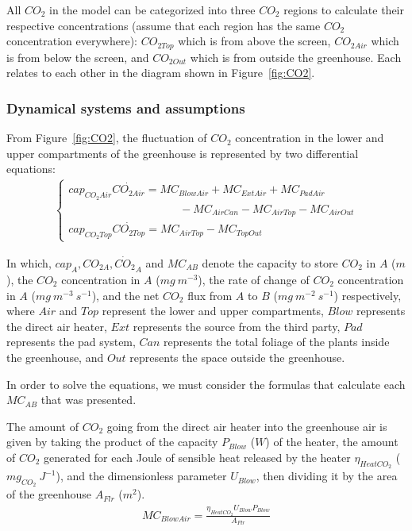 \documentclass[a4paper]{article}
\numberwithin{equation}{section}
\begin{document}
All \( CO_2 \) in the model can be categorized into three \( CO_2 \) regions to calculate their respective concentrations (assume that each region has the same \( CO_2 \) concentration everywhere): \( CO_{2Top} \) which is from above the screen, \( CO_{2Air} \) which is from below the screen, and \( CO_{2Out} \) which is from outside the greenhouse.
Each relates to each other in the diagram shown in Figure~\ref{fig:CO2}.

\subsubsection{Dynamical systems and assumptions}
From Figure~\ref{fig:CO2}, the fluctuation of \( CO_2 \) concentration in the lower and upper compartments of the greenhouse is represented by two differential equations:
\begin{align}
  \begin{cases}
    cap_{CO_2Air}\dot{CO_{2Air}} = MC_{BlowAir} + MC_{ExtAir} + MC_{PadAir} \\ \qquad \qquad \qquad \qquad \qquad
    - MC_{AirCan} - MC_{AirTop} - MC_{AirOut}                               \\
    cap_{CO_2Top}\dot{CO_{2Top}} = MC_{AirTop} - MC_{TopOut}
  \end{cases}
\end{align}

In which, \( cap_A, CO_{2 A}, \dot{CO_2}_A \) and \( MC_{AB} \) denote the capacity to store \( CO_2 \) in \( A \) (\( m \)), the \( CO_2 \) concentration in \( A \) (\( mg\ m^{-3} \)), the rate of change of \( CO_2 \) concentration in \( A \) (\( mg\ m^{-3}\ s^{-1} \)), and the net \( CO_2 \) flux from \( A \) to \( B \) (\( mg\ m^{-2}\ s^{-1} \)) respectively, where \( Air \) and \( Top \) represent the lower and upper compartments, \( Blow \) represents the direct air heater, \( Ext \) represents the source from the third party, \( Pad \) represents the pad system, \( Can \) represents the total foliage of the plants inside the greenhouse, and \( Out \) represents the space outside the greenhouse.

In order to solve the equations, we must consider the formulas that calculate each \( MC_{AB} \) that was presented.

The amount of \( CO_2 \) going from the direct air heater into the greenhouse air is given by taking the product of the capacity \( P_{Blow} \) (\( W \)) of the heater, the amount of \( CO_2 \) generated for each Joule of sensible heat released by the heater \( \eta_{HeatCO_2} \) (\( mg_{CO_2}\ J^{-1} \)), and the dimensionless parameter \( U_{Blow} \), then dividing it by the area of the greenhouse \( A_{Flr} \) (\( m^2 \)).
\begin{align}
  MC_{BlowAir} = \frac{\eta_{HeatCO_2}U_{Blow}P_{Blow}}{A_{Flr}}
\end{align}
\end{document}
